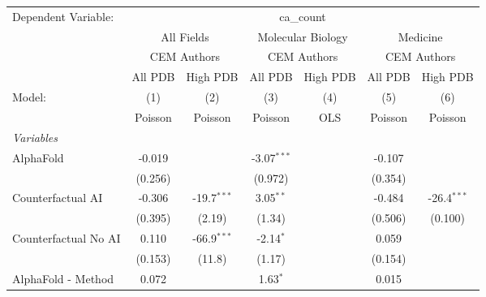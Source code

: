 \begingroup
\centering
\begin{tabular}{lcccccc}
   \tabularnewline \midrule \midrule
   Dependent Variable: & \multicolumn{6}{c}{ca\_count}\\
 & \multicolumn{2}{c}{All Fields} & \multicolumn{2}{c}{Molecular Biology} & \multicolumn{2}{c}{Medicine} \\
\cmidrule(lr){2-3} \cmidrule(lr){4-5} \cmidrule(lr){6-7}
 & \multicolumn{2}{c}{CEM Authors} & \multicolumn{2}{c}{CEM Authors} & \multicolumn{2}{c}{CEM Authors} \\
\cmidrule(lr){2-3} \cmidrule(lr){4-5} \cmidrule(lr){6-7}
 & \multicolumn{1}{c}{All PDB} & \multicolumn{1}{c}{High PDB} & \multicolumn{1}{c}{All PDB} & \multicolumn{1}{c}{High PDB} & \multicolumn{1}{c}{All PDB} & \multicolumn{1}{c}{High PDB} \\
\cmidrule(lr){2-2} \cmidrule(lr){3-3} \cmidrule(lr){4-4} \cmidrule(lr){5-5} \cmidrule(lr){6-6} \cmidrule(lr){7-7}
   Model:                                                     & (1)        & (2)           & (3)           & (4)  & (5)     & (6)\\  
                                                              &  Poisson   & Poisson       & Poisson       & OLS  & Poisson & Poisson\\  
   \midrule
   \emph{Variables}\\
   AlphaFold                                                  & -0.019     &               & -3.07$^{***}$ &      & -0.107  &   \\   
                                                              & (0.256)    &               & (0.972)       &      & (0.354) &   \\   
   Counterfactual AI                                          & -0.306     & -19.7$^{***}$ & 3.05$^{**}$   &      & -0.484  & -26.4$^{***}$\\   
                                                              & (0.395)    & (2.19)        & (1.34)        &      & (0.506) & (0.100)\\   
   Counterfactual No AI                                       & 0.110      & -66.9$^{***}$ & -2.14$^{*}$   &      & 0.059   &   \\   
                                                              & (0.153)    & (11.8)        & (1.17)        &      & (0.154) &   \\   
   AlphaFold - Method                                         & 0.072      &               & 1.63$^{*}$    &      & 0.015   &   \\   

\end{tabular}
